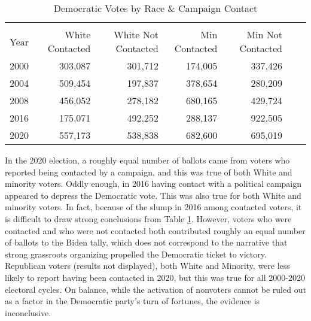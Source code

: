 \begin{table}[H]
\centering
\caption{Democratic Votes by Race \& Campaign Contact}
\label{tab:extended-demvotescount}
\begin{threeparttable}
\begin{tabular}{rrrrrrr}
  \hline \\ \vspace{0.5em} 
Year& White Contacted & White Not Contacted & Min Contacted & Min Not Contacted \\ 
  \hline
2000  & 303,087 & 301,712 & 174,005 & 337,426 \\ 
  2004  & 509,454 & 197,837 & 378,654 & 280,209 \\ 
  2008  & 456,052 & 278,182 & 680,165 & 429,724 \\ 
  2016  & 175,071 & 492,252 & 288,137 & 922,505 \\ 
  2020  & 557,173 & 538,838 & 682,600 & 695,019 \\ 
   \hline
\end{tabular}
\end{threeparttable}
\end{table}

In the 2020 election, a roughly equal number of ballots came from voters who reported being contacted by a campaign, and this was true of both White and minority voters. Oddly enough, in 2016 having contact with a political campaign appeared to depress the Democratic vote. This was also true for both White and minority voters. In fact, because of the slump in 2016 among contacted voters, it is difficult to draw strong conclusions from Table \ref{tab:extended-demvotescount}. However, voters who were contacted and who were not contacted both contributed roughly an equal number of ballots to the Biden tally, which does not correspond to the narrative that strong grassroots organizing propelled the Democratic ticket to victory. Republican voters (results not displayed), both White and Minority, were less likely to report having been contacted in 2020, but this was true for all 2000-2020 electoral cycles. On balance, while the activation of nonvoters cannot be ruled out as a factor in the Democratic party's turn of fortunes, the evidence is inconclusive.       


